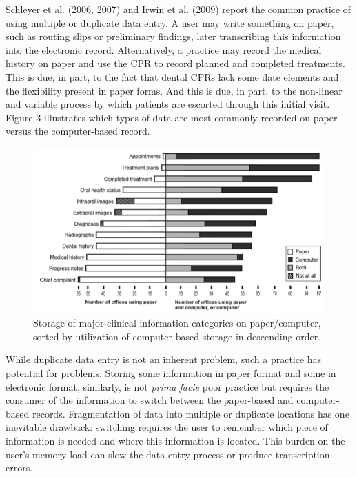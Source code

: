 \documentclass[11pt]{article}
\begin{document}
Schleyer et al. (2006, 2007) and Irwin et al. (2009) report the common practice of using multiple or duplicate data entry. A user may write something on paper, such as routing slips or preliminary findings, later transcribing this information into the electronic record. Alternatively, a practice may record the medical history on paper and use the CPR to record planned and completed treatments. This is due, in part, to the fact that dental CPRs lack some date elements and the flexibility present in paper forms.\cite{Schleyer2007A-Qualitative-I} And this is due, in part, to the non-linear and variable process by which patients are escorted through this initial visit. Figure 3 illustrates which types of data are most commonly recorded on paper versus the computer-based record.\label{fig:3}
\begin{figure}[!b]
\begin{center}
\includegraphics[width=360pt]{papervscomp.jpg}
\end{center}
\caption{Storage of major clinical information categories on paper/computer, sorted by utilization of computer-based storage in descending order.\cite{Schleyer2007A-Qualitative-I}}
\end{figure}
While duplicate data entry is not an inherent problem, such a practice has potential for problems. Storing some information in paper format and some in electronic format, similarly, is not \emph{prima facie} poor practice but requires the consumer of the information to switch between the paper-based and computer-based records. Fragmentation of data into multiple or duplicate locations has one inevitable drawback: switching requires the user to remember which piece of information is needed and where this information is located. This burden on the user's memory load can slow the data entry process or produce transcription errors.\cite{Salvucci2009Toward-a-unifie}
\end{document}
